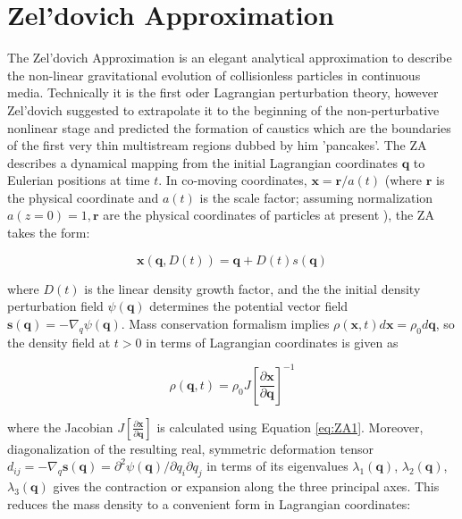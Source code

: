 \section{Zel'dovich Approximation}

\label{sec:ZA}

The Zel'dovich Approximation is an elegant analytical approximation to describe the non-linear gravitational evolution of collisionless particles in continuous media. Technically it is the first oder Lagrangian perturbation theory, however Zel'dovich suggested to extrapolate it to the beginning of the non-perturbative nonlinear stage and predicted the formation of caustics which are the boundaries of
the first very thin multistream regions dubbed by him  'pancakes'. The
ZA describes a dynamical mapping from the initial Lagrangian coordinates $\mathbf{q}$ to Eulerian positions at time $t$. In co-moving coordinates, $\mathbf{x} = \mathbf{r}/a(t)$ (where $\mathbf{r}$ is the physical coordinate  and $a(t)$ is the scale factor; assuming normalization $a(z=0)=1, \mathbf{r}$ are 
the physical coordinates of particles at present ), the ZA takes the form:

\begin{equation} \label{eq:ZA1}
 \mathbf{x}(\mathbf{q}, D(t) ) = \mathbf{q} + D(t) s(\mathbf{q}) 
\end{equation}

where $D(t)$ is the linear density growth factor, and the the initial density perturbation field $\psi(\mathbf{q})$ determines the potential vector field $\mathbf{s(q)} = - \nabla_q \psi(\mathbf{q})$. 
Mass conservation formalism implies $\rho(\mathbf{x}, t) d\mathbf{x} = \rho_0 d\mathbf{q} $, so the density field at $t>0$ in terms of Lagrangian coordinates is given as 

\begin{equation}
 \rho(\mathbf{q}, t) = \rho_0 J \left[ \frac{\partial\mathbf{x}}{\partial\mathbf{q}} \right]^{-1}
\end{equation}

where the Jacobian $J \left[ \frac{\partial\mathbf{x}}{\partial\mathbf{q}} \right]$ is calculated using Equation \ref{eq:ZA1}. Moreover, diagonalization of the resulting real, symmetric deformation tensor $d_{ij} = - \nabla_q \mathbf{s(q)} =  \partial^2 \psi(\mathbf{q})/ \partial q_i \partial q_j$ in terms of its eigenvalues $\lambda_1(\mathbf{q})$, $\lambda_2(\mathbf{q})$, $\lambda_3(\mathbf{q})$ gives the contraction or expansion along the three principal axes. This reduces the mass density to a convenient form in Lagrangian coordinates:


